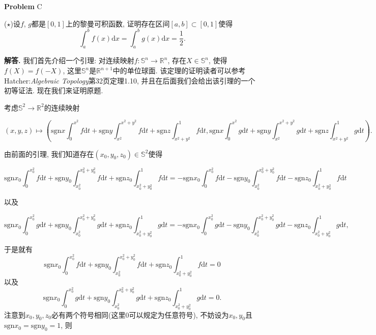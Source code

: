 \documentclass{article}
\newcounter{problemname}
\newenvironment{problem}{\begin{shaded}\stepcounter{problemname}\par\noindent\textbf{Problem }}{\end{shaded}\par}
\newenvironment{solution}{\par\noindent\textbf{解答. }}{\par}
\begin{document}
\begin{problem}{C}\par
($\star$)设$f$, $g$都是$[0,1]$上的黎曼可积函数, 证明存在区间$[a,b]\subset[0,1]$使得
$$
\int_a^bf(x)\mathrm{d}x=\int_a^bg(x)\mathrm{d}x=\frac{1}{2}.
$$
\end{problem}
\begin{solution}
我们首先介绍一个引理: 对连续映射$f:\mathbb{S}^n\to\mathbb{R}^n$, 存在$X\in\mathbb{S}^n$, 使得$f(X)=f(-X)$, 这里$\mathbb{S}^n$是$\mathbb{R}^{n+1}$中的单位球面. 该定理的证明读者可以参考Hatcher:\textit{Algebraic Topology}第32页定理1.10, 并且在后面我们会给出该引理的一个初等证法. 现在我们来证明原题.\par
考虑$\mathbb{S}^2\to\mathbb{R}^2$的连续映射
\begin{small}
$$
\left( x,y,z \right) \mapsto \left( \mathrm{sgn} x\int_0^{x^2}{f\mathrm{d}t}+\mathrm{sgn} y\int_{x^2}^{x^2+y^2}{f\mathrm{d}t}+\mathrm{sgn} z\int_{x^2+y^2}^1{f\mathrm{d}t},\mathrm{sgn} x\int_0^{x^2}{g\mathrm{d}t}+\mathrm{sgn} y\int_{x^2}^{x^2+y^2}{g\mathrm{d}t}+\mathrm{sgn} z\int_{x^2+y^2}^1{g\mathrm{d}t} \right) .
$$
\end{small}
由前面的引理, 我们知道存在$(x_0,y_0,z_0)\in\mathbb{S}^2$使得
\begin{small}
$$
\mathrm{sgn} x_0\int_0^{x_{0}^{2}}{f\mathrm{d}t}+\mathrm{sgn} y_0\int_{x_{0}^{2}}^{x_{0}^{2}+y_{0}^{2}}{f\mathrm{d}t}+\mathrm{sgn} z_0\int_{x_{0}^{2}+y_{0}^{2}}^1{f\mathrm{d}t}=-\mathrm{sgn} x_0\int_0^{x_{0}^{2}}{f\mathrm{d}t}-\mathrm{sgn} y_0\int_{x_{0}^{2}}^{x_{0}^{2}+y_{0}^{2}}{f\mathrm{d}t}-\mathrm{sgn} z_0\int_{x_{0}^{2}+y_{0}^{2}}^1{f\mathrm{d}t}
$$
\end{small}
以及
\begin{small}
$$
\mathrm{sgn} x_0\int_0^{x_{0}^{2}}{g\mathrm{d}t}+\mathrm{sgn} y_0\int_{x_{0}^{2}}^{x_{0}^{2}+y_{0}^{2}}{g\mathrm{d}t}+\mathrm{sgn} z_0\int_{x_{0}^{2}+y_{0}^{2}}^1{g\mathrm{d}t}=-\mathrm{sgn} x_0\int_0^{x_{0}^{2}}{g\mathrm{d}t}-\mathrm{sgn} y_0\int_{x_{0}^{2}}^{x_{0}^{2}+y_{0}^{2}}{g\mathrm{d}t}-\mathrm{sgn} z_0\int_{x_{0}^{2}+y_{0}^{2}}^1{g\mathrm{d}t},
$$
\end{small}
于是就有
$$
\mathrm{sgn} x_0\int_0^{x_{0}^{2}}{f\mathrm{d}t}+\mathrm{sgn} y_0\int_{x_{0}^{2}}^{x_{0}^{2}+y_{0}^{2}}{f\mathrm{d}t}+\mathrm{sgn} z_0\int_{x_{0}^{2}+y_{0}^{2}}^1{f\mathrm{d}t}=0
$$
以及
$$
\mathrm{sgn} x_0\int_0^{x_{0}^{2}}{g\mathrm{d}t}+\mathrm{sgn} y_0\int_{x_{0}^{2}}^{x_{0}^{2}+y_{0}^{2}}{g\mathrm{d}t}+\mathrm{sgn} z_0\int_{x_{0}^{2}+y_{0}^{2}}^1{g\mathrm{d}t}=0.
$$
注意到$x_0,y_0,z_0$必有两个符号相同(这里$0$可以规定为任意符号), 不妨设为$x_0,y_0$且$\mathrm{sgn}x_0=\mathrm{sgn}y_0=1$, 则

\end{solution}
\end{document}
